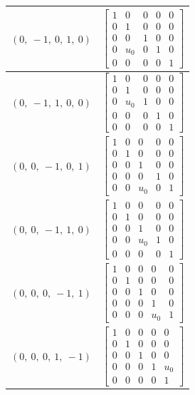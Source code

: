 \documentclass[11pt]{article}
\theoremstyle{definition}
\begin{document}
\begin{longtable}{|l|c|}
    \hline
    $\left( 0, \  -1, \  0, \  1, \  0\right)$ & ${\left[\begin{matrix}1 & 0 & 0 & 0 & 0\\0 & 1 & 0 & 0 & 0\\0 & 0 & 1 & 0 & 0\\0 & u_{0} & 0 & 1 & 0\\0 & 0 & 0 & 0 & 1\end{matrix}\right]}$ \\
    \hline
    $\left( 0, \  -1, \  1, \  0, \  0\right)$ & ${\left[\begin{matrix}1 & 0 & 0 & 0 & 0\\0 & 1 & 0 & 0 & 0\\0 & u_{0} & 1 & 0 & 0\\0 & 0 & 0 & 1 & 0\\0 & 0 & 0 & 0 & 1\end{matrix}\right]}$ \\
    \hline
    $\left( 0, \  0, \  -1, \  0, \  1\right)$ & ${\left[\begin{matrix}1 & 0 & 0 & 0 & 0\\0 & 1 & 0 & 0 & 0\\0 & 0 & 1 & 0 & 0\\0 & 0 & 0 & 1 & 0\\0 & 0 & u_{0} & 0 & 1\end{matrix}\right]}$ \\
    \hline
    $\left( 0, \  0, \  -1, \  1, \  0\right)$ & ${\left[\begin{matrix}1 & 0 & 0 & 0 & 0\\0 & 1 & 0 & 0 & 0\\0 & 0 & 1 & 0 & 0\\0 & 0 & u_{0} & 1 & 0\\0 & 0 & 0 & 0 & 1\end{matrix}\right]}$ \\
    \hline
    $\left( 0, \  0, \  0, \  -1, \  1\right)$ & ${\left[\begin{matrix}1 & 0 & 0 & 0 & 0\\0 & 1 & 0 & 0 & 0\\0 & 0 & 1 & 0 & 0\\0 & 0 & 0 & 1 & 0\\0 & 0 & 0 & u_{0} & 1\end{matrix}\right]}$ \\
    \hline
    $\left( 0, \  0, \  0, \  1, \  -1\right)$ & ${\left[\begin{matrix}1 & 0 & 0 & 0 & 0\\0 & 1 & 0 & 0 & 0\\0 & 0 & 1 & 0 & 0\\0 & 0 & 0 & 1 & u_{0}\\0 & 0 & 0 & 0 & 1\end{matrix}\right]}$ \\

\end{longtable}
\end{document}
